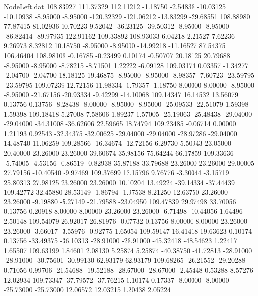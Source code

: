 \begin{filecontents}{NodeLeft.dat}
 108.83927  111.37329  112.11212    -1.18750   -2.54838  -10.03125  -10.10938   -8.95000   -8.95000 -120.32329 -121.06212  -13.83299  -29.68551
 108.88980   77.87415   81.02936    10.70223    9.52042  -36.23125  -39.50312   -8.95000   -8.95000  -86.82414  -89.97935  122.91162  109.33892
 108.93033    6.04218    2.21527     7.62236    9.26973    8.32812   10.18750   -8.95000   -8.95000  -14.99218  -11.16527   87.54375  106.46404
 108.98108   -0.16785   -0.23499     0.10174   -0.50707   20.18125   20.79688   -8.95000   -8.95000   -8.78215   -8.71501    1.22222   -6.09128
 109.03174    0.03357   -1.34277    -2.04700   -2.04700   18.18125   19.46875   -8.95000   -8.95000   -8.98357   -7.60723  -23.59795  -23.59795
 109.07239   12.72156   11.98334    -0.79357   -1.18750    8.00000    8.00000   -8.95000   -8.95000  -21.67156  -20.93334   -9.42299  -14.10068
 109.14347   16.14532   13.56079     0.13756    0.13756   -8.28438   -8.00000   -8.95000   -8.95000  -25.09533  -22.51079    1.59398    1.59398
 109.18418    5.27008    7.58606     1.89237    1.57005  -25.19063  -25.48438  -29.04000  -29.04000  -34.31008  -36.62606   22.59665   18.74794
 109.23485   -0.06714    0.00000     1.21193    0.92543  -32.34375  -32.00625  -29.04000  -29.04000  -28.97286  -29.04000   14.48740   11.06259
 109.28566  -16.34674  -12.72156     6.29730    5.50943   23.05000   20.40000   23.26000   23.26000   39.60674   35.98156   75.64244   66.17859
 109.33636   -5.74005   -4.53156    -0.86519   -0.82938   35.87188   33.79688   23.26000   23.26000   29.00005   27.79156  -10.40540   -9.97469
 109.37699   13.15796    9.76776    -3.30044   -3.15719   25.80313   27.98125   23.26000   23.26000   10.10204   13.49224  -39.14334  -37.44439
 109.42772   32.45880   28.53149    -1.86794   -1.97538    8.21250   12.63750   23.26000   23.26000   -9.19880   -5.27149  -21.79588  -23.04950
 109.47839   29.97498   33.70056     0.13756    0.20918    8.00000    8.00000   23.26000   23.26000   -6.71498  -10.44056    1.64496    2.50148
 109.54079   26.92017   26.81976    -0.07732    0.13756    8.00000    8.00000   23.26000   23.26000   -3.66017   -3.55976   -0.92775    1.65054
 109.59147   16.41418   19.63623     0.10174    0.13756  -33.49375  -36.10313  -28.91000  -28.91000  -45.32418  -48.54623    1.22417    1.65507
 109.63199    1.84601    2.08130     5.25874    5.25874  -40.38750  -41.72813  -28.91000  -28.91000  -30.75601  -30.99130   62.93179   62.93179
 109.68265  -26.21552  -29.20288     0.71056    0.99706  -21.54688  -19.52188  -28.67000  -28.67000   -2.45448    0.53288    8.57276   12.02934
 109.73347  -37.79572  -37.76215     0.10174    0.17337   -8.00000   -8.00000  -25.73000  -25.73000   12.06572   12.03215    1.20438    2.05224

\end{filecontents}
